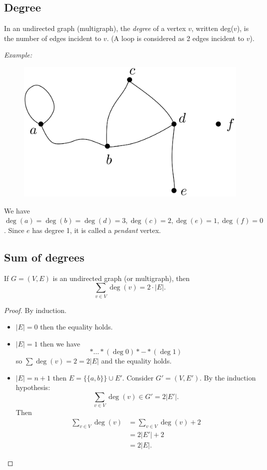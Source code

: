 \documentclass[11pt]{article}
\begin{document}
    \subsection{Degree}

    In an undirected graph (multigraph), the \emph{degree} of a vertex $v$, written deg($v$), is the number of edges incident to $v$. (A loop is considered as 2 edges incident to $v$).

    \vspace{1em}

    \emph{Example:}
    \begin{figure}[H]
        \centering
        \includegraphics[scale=0.1]{deg.png}
    \end{figure}
    We have \(\deg(a) = \deg(b) = \deg(d) = 3, \deg(c)=2, \deg(e)=1, \deg(f) = 0\). Since $e$ has degree 1, it is called a \emph{pendant} vertex.

    \subsection{Sum of degrees}

    If \(G = (V,E)\) is an undirected graph (or multigraph), then \[\sum_{v \in V} \deg(v) = 2 \cdot |E|.\]

    \begin{proof}
        By induction.
        \begin{itemize}
            \item \(|E| = 0\) then the equality holds.
            \item \(|E| = 1\) then we have \[* \dots * (\deg 0) * - * (\deg 1)\] so \(\sum \deg(v) = 2 = 2 |E|\) and the equality holds. 
            \item \(|E| = n+1\) then \(E = \{\{a,b\}\} \cup E'\). Consider \(G' = (V,E')\). By the induction hypothesis: \[\sum_{v \in V} \deg(v) \in G' = 2|E'|.\] Then 
            \begin{align*}
                \sum_{v \in V} \deg(v) &= \sum_{v \in V} \deg(v) + 2 \\
                                       &= 2 |E'| + 2\\
                                       &= 2 |E|.
            \end{align*}
        \end{itemize}
    \end{proof}
\end{document}
